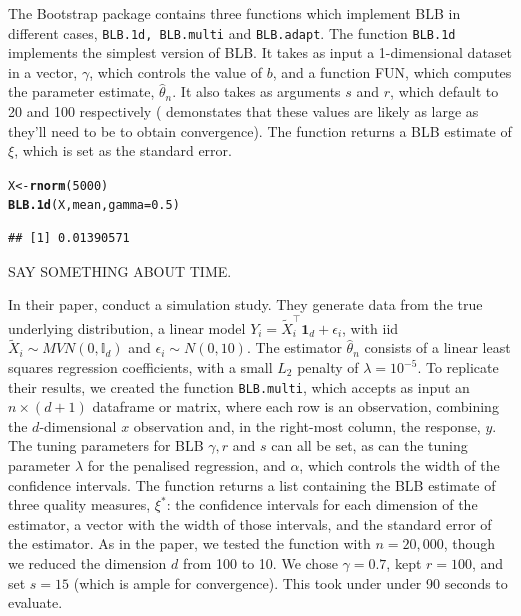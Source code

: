 \documentclass{article}\usepackage[]{graphicx}\usepackage[]{color}
\makeatletter
\newcommand{\hlnum}[1]{\textcolor[rgb]{0.686,0.059,0.569}{#1}}%
\newcommand{\hlstd}[1]{\textcolor[rgb]{0.345,0.345,0.345}{#1}}%
\newcommand{\hlkwb}[1]{\textcolor[rgb]{0.69,0.353,0.396}{#1}}%
\newcommand{\hlkwc}[1]{\textcolor[rgb]{0.333,0.667,0.333}{#1}}%
\newcommand{\hlkwd}[1]{\textcolor[rgb]{0.737,0.353,0.396}{\textbf{#1}}}%
\newenvironment{kframe}{%
 \def\at@end@of@kframe{}%
 \ifinner\ifhmode%
  \def\at@end@of@kframe{\end{minipage}}%
  \begin{minipage}{\columnwidth}%
 \fi\fi%
 \def\FrameCommand##1{\hskip\@totalleftmargin \hskip-\fboxsep
 \colorbox{shadecolor}{##1}\hskip-\fboxsep
     \hskip-\linewidth \hskip-\@totalleftmargin \hskip\columnwidth}%
 \MakeFramed {\advance\hsize-\width
   \@totalleftmargin\z@ \linewidth\hsize
   \@setminipage}}%
 {\par\unskip\endMakeFramed%
 \at@end@of@kframe}
\newenvironment{knitrout}{}{} %
\makeatother
\begin{document}
The Bootstrap package contains three functions which implement BLB in different cases, \texttt{BLB.1d, BLB.multi} and \texttt{BLB.adapt}. The function \texttt{BLB.1d} implements the simplest version of BLB. It takes as input a 1-dimensional dataset in a vector, $\gamma$, which controls the value of $b$, and a function FUN, which computes the parameter estimate, $\hat\theta_n$. It also takes as arguments $s$ and $r$, which default to 20 and 100 respectively (\textcite{Kleiner2014} demonstates that these values are likely as large as they'll need to be to obtain convergence). The function returns a BLB estimate of $\xi$, which is set as the standard error.

\begin{knitrout}
\color{fgcolor}\begin{kframe}
\begin{alltt}
\hlstd{X} \hlkwb{<-} \hlkwd{rnorm}\hlstd{(}\hlnum{5000}\hlstd{)}
\hlkwd{BLB.1d}\hlstd{(X, mean,} \hlkwc{gamma}\hlstd{=}\hlnum{0.5}\hlstd{)}
\end{alltt}
\begin{verbatim}
## [1] 0.01390571
\end{verbatim}
\end{kframe}
\end{knitrout}
SAY SOMETHING ABOUT TIME.

In their paper, \textcite{Kleiner2014} conduct a simulation study. They generate data from the true underlying distribution, a linear model $Y_i = \tilde X_i^{\top}\textbf{1}_d + \epsilon_i$, with iid $\tilde X_i \sim MVN(0,\mathbb{I}_d)$ and $\epsilon_i \sim N(0,10)$. The estimator $\hat\theta_n$ consists of a linear least squares regression coefficients, with a small $L_2$ penalty of $\lambda=10^{-5}$. To replicate their results, we created the function \texttt{BLB.multi}, which accepts as input an $n \times (d+1)$ dataframe or matrix, where each row is an observation, combining the $d$-dimensional $x$ observation and, in the right-most column, the response, $y$. The tuning parameters for BLB $\gamma, r$ and $s$ can all be set, as can the tuning parameter $\lambda$ for the penalised regression, and $\alpha$, which controls the width of the confidence intervals. The function returns a list containing the BLB estimate of three quality measures, $\xi^*$: the confidence intervals for each dimension of the estimator, a vector with the width of those intervals, and the standard error of the estimator. As in the paper, we tested the function with $n=20,000$, though we reduced the dimension $d$ from 100 to 10. We chose $\gamma=0.7$, kept $r=100$, and set $s=15$ (which is ample for convergence). This took under under 90 seconds to evaluate.
\end{document}
